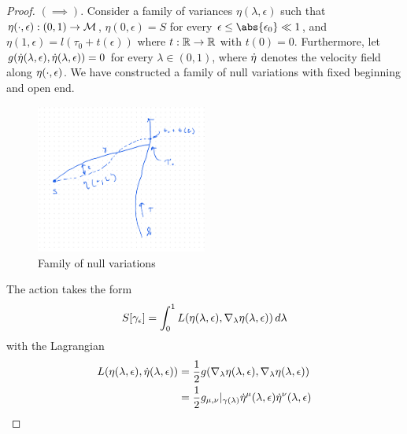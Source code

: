 \begin{proof}
$(\implies)$. Consider a family of variances $\eta(\lambda, \epsilon)$ such that $\eta(\cdot, \epsilon) : (0,1) \to \mathcal{M}$, $\eta(0, \epsilon) = S$ for every $\eps \le \abs{\eps_0} \ll 1$, and $\eta(1, \epsilon) = l(\tau_0 + t(\epsilon))$ where $t: \mathbb{R} \to \mathbb{R}$ with $t(0)=0$.
Furthermore, let $g(\dot{\eta}(\lambda, \epsilon), \dot{\eta}(\lambda, \epsilon)) = 0$ for every $\lambda \in (0,1)$, where $\dot{\eta}$ denotes the velocity field along $\eta(\cdot, \epsilon)$. We have constructed a family of null variations with fixed beginning and open end.
%
\begin{figure}[!htb]
	\centering
	\includegraphics[width=0.5\textwidth]{img/null-variations.png}
	\caption{Family of null variations}
	\label{}
\end{figure}

The action takes the form
\begin{equation}\label{}
S[\gamma_{\epsilon}] = \int_0^1 L(\eta(\lambda, \epsilon), \nabla_{\lambda} \eta(\lambda, \epsilon)) \, d\lambda
\end{equation}
with the Lagrangian
\begin{align*}
L(\eta(\lambda, \epsilon), \dot{\eta}(\lambda, \epsilon)) &= \frac{1}{2} g (\nabla_{\lambda} \eta(\lambda, \epsilon), \nabla_{\lambda} \eta(\lambda, \epsilon)) \\
&= \frac{1}{2} g_{\mu, \nu} \rvert_{\gamma(\lambda)} \dot{\eta}^{\mu} (\lambda, \epsilon) \dot{\eta}^{\nu}(\lambda, \epsilon)
\end{align*}




\end{proof}
